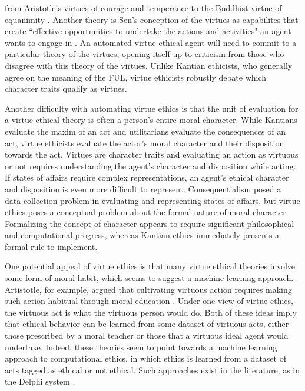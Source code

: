 \begin{isabellebody}
\begin{isamarkuptext}
from Aristotle's virtues of courage and temperance to the Buddhist virtue of 
equanimity \cite{aristotle, mcrae}. Another theory is Sen's conception of the virtues as capabilites that create
``effective opportunities to undertake the actions and activities" an agent wants to engage in \cite{robeyns}. 
An automated virtue ethical agent will need to commit to a particular theory of the virtues, opening 
itself up to criticism from those who disagree with this theory of the virtues. Unlike Kantian ethicists, 
who generally agree on the meaning of the FUL, virtue ethicists robustly debate which character traits qualify as virtues.%
\end{isamarkuptext}\isamarkuptrue%
%
\isadelimdocument
%
\endisadelimdocument
%
\isatagdocument
%
\isamarkuptrue%
%
\endisatagdocument
{\isafolddocument}%
%
\isadelimdocument
%
\endisadelimdocument
%
\begin{isamarkuptext}%
Another difficulty with automating virtue ethics is that the unit of evaluation for a virtue ethical
theory is often a person's entire moral character. While Kantians evaluate the maxim of an act and utilitarians
evaluate the consequences of an act, virtue ethicists evaluate the actor's moral character and their 
disposition towards the act. Virtues are character traits and evaluating an action as virtuous or 
not requires understanding the agent's character and disposition while acting. If states of affairs
require complex representations, an agent's ethical character and disposition is even more difficult
to represent. Consequentialism posed a data-collection problem in evaluating and representing states
of affairs, but virtue ethics poses a conceptual problem about the formal nature of moral character.
Formalizing the concept of character appears to require significant philosophical and computational
progress, whereas Kantian ethics immediately presents a formal rule to implement.%
\end{isamarkuptext}\isamarkuptrue%
%
\isadelimdocument
%
\endisadelimdocument
%
\isatagdocument
%
\isamarkuptrue%
%
\endisatagdocument
{\isafolddocument}%
%
\isadelimdocument
%
\endisadelimdocument
%
\begin{isamarkuptext}%
One potential appeal of virtue ethics is that many virtue ethical theories involve some form of 
moral habit, which seems to suggest a machine learning approach. Artistotle, for example, argued 
that cultivating virtuous action requires making such action habitual through moral education \cite{aristotle}. Under 
one view of virtue ethics, the virtuous act is what the virtuous person would do. Both of these ideas
imply that ethical behavior can be learned from some dataset of virtuous acts, either those 
prescribed by a moral teacher or those that a virtuous ideal agent would undertake. Indeed, these 
theories seem to point towards a machine learning approach to computational ethics, in which ethics is 
learned from a dataset of acts tagged as ethical or not ethical. Such approaches exist in the literature, 
as in the Delphi system \cite{delphi}. 


\end{isamarkuptext}
\end{isabellebody}
